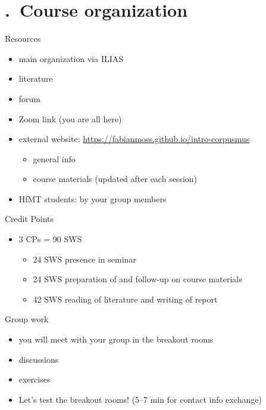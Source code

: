 \section{\thesection.~Course organization}

\begin{frame}{Resources}
    \begin{itemize}
      \item main organization via ILIAS
      \item literature
      \item forum
      \item Zoom link (you are all here)
      \item external website: \url{https://fabianmoss.github.io/intro-corpusmus}
      \begin{itemize}
        \item general info
        \item course materials (updated after each session)
      \end{itemize}
      \item HfMT students: by your group members
  \end{itemize}
\end{frame}

\begin{frame}{Credit Points}
  \begin{itemize}
    \item 3 CPs = 90 SWS
    \begin{itemize}
      \item 24 SWS presence in seminar
      \item 24 SWS preparation of and follow-up on course materials
      \item 42 SWS reading of literature and writing of report
    \end{itemize}
  \end{itemize}
\end{frame}

\begin{frame}{Group work}
  \begin{itemize}
    \item you will meet with your group in the breakout rooms
    \item discussions
    \item exercises
    \item Let's test the breakout rooms! (5--7 min for contact info exchange)
  \end{itemize}
\end{frame}


